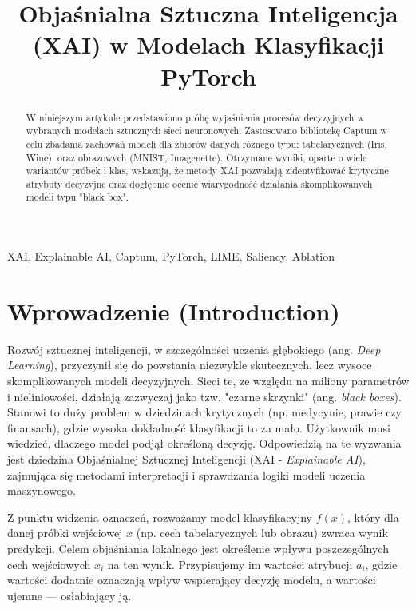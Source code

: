 \documentclass[conference]{IEEEtran}
\begin{document}
\title{Objaśnialna Sztuczna Inteligencja (XAI) w Modelach Klasyfikacji PyTorch\\}

\author{
}

\maketitle

\begin{abstract}
W niniejszym artykule przedstawiono próbę wyjaśnienia procesów decyzyjnych w wybranych modelach sztucznych sieci neuronowych. Zastosowano bibliotekę Captum w celu zbadania zachowań modeli dla zbiorów danych różnego typu: tabelarycznych (Iris, Wine), oraz obrazowych (MNIST, Imagenette). Otrzymane wyniki, oparte o wiele wariantów próbek i klas, wskazują, że metody XAI pozwalają zidentyfikować krytyczne atrybuty decyzyjne oraz dogłębnie ocenić wiarygodność działania skomplikowanych modeli typu "black box".
\end{abstract}

\begin{IEEEkeywords}
XAI, Explainable AI, Captum, PyTorch, LIME, Saliency, Ablation
\end{IEEEkeywords}

\section{Wprowadzenie (Introduction)}
Rozwój sztucznej inteligencji, w szczególności uczenia głębokiego (ang. \textit{Deep Learning}), przyczynił się do powstania niezwykle skutecznych, lecz wysoce skomplikowanych modeli decyzyjnych. Sieci te, ze względu na miliony parametrów i nieliniowości, działają zazwyczaj jako tzw. "czarne skrzynki" (ang. \textit{black boxes}). Stanowi to duży problem w dziedzinach krytycznych (np. medycynie, prawie czy finansach), gdzie wysoka dokładność klasyfikacji to za mało. Użytkownik musi wiedzieć, dlaczego model podjął określoną decyzję. Odpowiedzią na te wyzwania jest dziedzina Objaśnialnej Sztucznej Inteligencji (XAI - \textit{Explainable AI}), zajmująca się metodami interpretacji i sprawdzania logiki modeli uczenia maszynowego.

Z punktu widzenia oznaczeń, rozważamy model klasyfikacyjny $f(x)$, który dla danej próbki wejściowej $x$ (np. cech tabelarycznych lub obrazu) zwraca wynik predykcji. Celem objaśniania lokalnego jest określenie wpływu poszczególnych cech wejściowych $x_i$ na ten wynik. Przypisujemy im wartości atrybucji $a_i$, gdzie wartości dodatnie oznaczają wpływ wspierający decyzję modelu, a wartości ujemne — osłabiający ją. 
\end{document}
